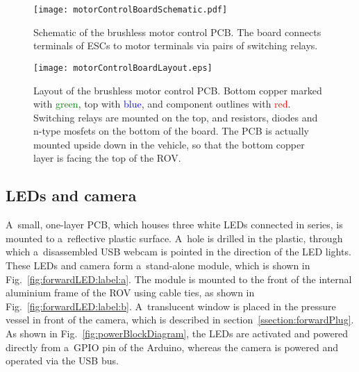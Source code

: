 \begin{figure}[htb]
\begin{minipage}[b]{1\linewidth}
  \centering
	\texttt{[image: motorControlBoardSchematic.pdf]}
\end{minipage}
\caption{Schematic of the brushless motor control PCB. The board connects terminals of ESCs to motor terminals via pairs of switching relays.}
\label{fig:motorControlBoardSchematic}
\end{figure}

\begin{figure}[htb]
\begin{minipage}[b]{1\linewidth}
  \centering
	\texttt{[image: motorControlBoardLayout.eps]}
\end{minipage}
\caption{Layout of the brushless motor control PCB. Bottom copper marked with \textcolor{green}{green}, top with \textcolor{blue}{blue}, and component outlines with \textcolor{red}{red}. Switching relays are mounted on the top, and resistors, diodes and n-type mosfets on the bottom of the board. The PCB is actually mounted upside down in the vehicle, so that the bottom copper layer is facing the top of the ROV.}
\label{fig:motorControlBoardLayout}
\end{figure}

\clearpage %

\subsection{LEDs and camera}\label{ssection:ledAndCamera}
A~small, one-layer PCB, which houses three white LEDs connected in series, is mounted to a~reflective plastic surface. A~hole is drilled in the plastic, through which a~disassembled USB webcam is pointed in the direction of the LED lights. These LEDs and camera form a~stand-alone module, which is shown in Fig.~\ref{fig:forwardLED:label:a}. The module is mounted to the front of the internal aluminium frame of the ROV using cable ties, as shown in Fig.~\ref{fig:forwardLED:label:b}. A~translucent window is placed in the pressure vessel in front of the camera, which is described in section~\ref{ssection:forwardPlug}. As shown in Fig.~\ref{fig:powerBlockDiagram}, the LEDs are activated and powered directly from a~GPIO pin of the Arduino, whereas the camera is powered and operated via the USB bus.

